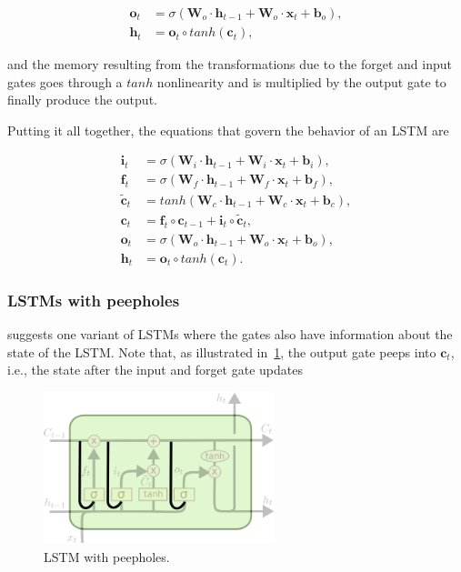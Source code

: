 \begin{equation}\label{eq:LSTM_output_gate}
\begin{split}
\mathbf{o}_t &= \sigma\left(\mathbf{W}_o \cdot \mathbf{h}_{t-1} +
\mathbf{W}_o \cdot \mathbf{x}_t + \mathbf{b}_o \right),\\
\mathbf{h}_t &= \mathbf{o}_t \circ tanh \left(\mathbf{c}_t\right),
\end{split}
\end{equation}

and the memory resulting from the transformations due to the forget and input gates goes through a $tanh$ nonlinearity and is multiplied by the output gate to finally produce the output.

Putting it all together, the equations that govern the behavior of an LSTM are

\begin{equation}\label{eq:LSTM}
\begin{split}
\mathbf{i}_t &= \sigma\left(\mathbf{W}_i \cdot \mathbf{h}_{t-1} +
\mathbf{W}_i \cdot \mathbf{x}_t + \mathbf{b}_i \right),\\
\mathbf{f}_t &= \sigma\left(\mathbf{W}_f \cdot \mathbf{h}_{t-1} +
\mathbf{W}_f \cdot \mathbf{x}_t + \mathbf{b}_f \right),\\
\mathbf{\tilde c}_t &= tanh \left(\mathbf{W}_c \cdot \mathbf{h}_{t-1} +
\mathbf{W}_c \cdot \mathbf{x}_t + \mathbf{b}_c \right),\\
\mathbf{c}_t &= \mathbf{f}_t \circ \mathbf{c}_{t-1} + \mathbf{i}_t
\circ \mathbf{\tilde c}_t,\\
\mathbf{o}_t &= \sigma\left(\mathbf{W}_o \cdot \mathbf{h}_{t-1} +
\mathbf{W}_o \cdot \mathbf{x}_t + \mathbf{b}_o \right),\\
\mathbf{h}_t &= \mathbf{o}_t \circ tanh \left(\mathbf{c}_t\right).
\end{split}
\end{equation}


\subsubsection{LSTMs with peepholes}

\cite{gers_00} suggests one variant of LSTMs where the gates also have information about the state of the LSTM. Note that, as illustrated in~\ref{fig:LSTM_peepholes}, the output gate peeps into $\mathbf{c}_t$, i.e., the state after the input and forget gate updates

\begin{figure}
	\centering
	\includegraphics[width=0.6\textwidth]{figures/LSTM_peepholes.pdf}
	\caption{LSTM with peepholes.\label{fig:LSTM_peepholes}}
\end{figure}

